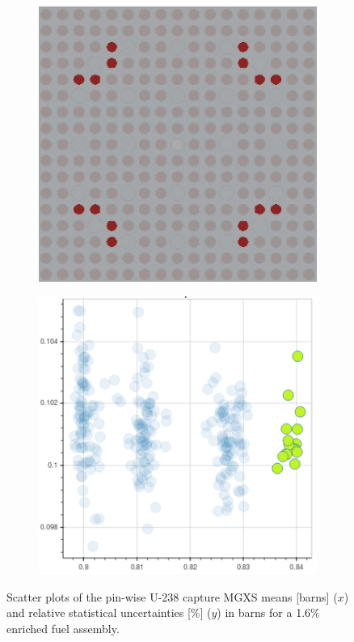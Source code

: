 \documentclass[12pt,twoside]{mitthesis-exec}
\begin{document}
\begin{figure}[h!]
\begin{subfigure}{0.45\textwidth}
  \caption{}
  \label{fig:chap10-capt-mean-std-mgxs-2}
\end{subfigure}
\begin{subfigure}{0.45\textwidth}
  \centering
  \includegraphics[width=0.9\linewidth]{figures/unsupervised/features/assm-16/u238-capt/mean-std/geometry-3}
  \caption{}
  \label{fig:chap10-capt-mean-std-geom-3}
\end{subfigure}%
\begin{subfigure}{0.45\textwidth}
  \centering
  \includegraphics[width=0.9\linewidth]{figures/unsupervised/features/assm-16/u238-capt/mean-std/mgxs-3}
  \caption{}
  \label{fig:chap10-capt-mean-std-mgxs-3}
\end{subfigure}
\caption[Clustering of U-238 capture MGXS]{Scatter plots of the pin-wise U-238 capture MGXS means [barns] ($x$) and relative statistical uncertainties [\%] ($y$) in barns for a 1.6\% enriched fuel assembly.}
\label{fig:capt-mean-std}
\end{figure}
\end{document}
